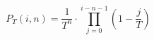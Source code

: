\documentclass{standalone}
\begin{document}
\centering
\begin{minipage}{5cm}
	\[
		P_T(i, n)
		=
		\frac{1}{T^n}
		\cdot
		\prod_{j=0}^{i - n - 1}
		\left(1 - \frac{j}{T}\right)
	\]
\end{minipage}
\end{document}
